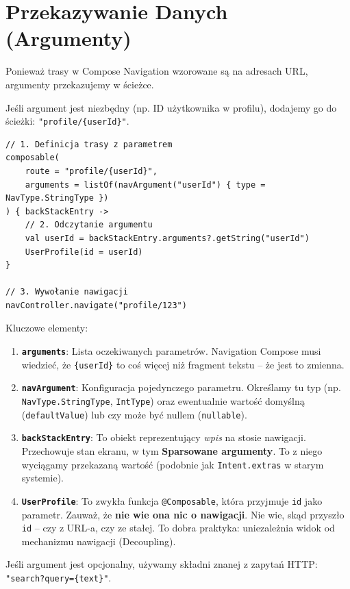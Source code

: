 \section{Przekazywanie Danych (Argumenty)}

Ponieważ trasy w Compose Navigation wzorowane są na adresach URL, argumenty przekazujemy w ścieżce.

Jeśli argument jest niezbędny (np. ID użytkownika w profilu), dodajemy go do ścieżki: \texttt{"profile/\{userId\}"}.

\begin{verbatim}
// 1. Definicja trasy z parametrem
composable(
    route = "profile/{userId}",
    arguments = listOf(navArgument("userId") { type = NavType.StringType })
) { backStackEntry ->
    // 2. Odczytanie argumentu
    val userId = backStackEntry.arguments?.getString("userId")
    UserProfile(id = userId)
}

// 3. Wywołanie nawigacji
navController.navigate("profile/123")
\end{verbatim}

Kluczowe elementy:
\begin{enumerate}
    \item \textbf{\texttt{arguments}}: Lista oczekiwanych parametrów. Navigation Compose musi wiedzieć, że \texttt{\{userId\}} to coś więcej niż fragment tekstu – że jest to zmienna.
    \item \textbf{\texttt{navArgument}}: Konfiguracja pojedynczego parametru. Określamy tu typ (np. \texttt{\-NavType.\-StringType}, \texttt{IntType}) oraz ewentualnie wartość domyślną (\texttt{defaultValue}) lub czy może być nullem (\texttt{nullable}).
    \item \textbf{\texttt{backStackEntry}}: To obiekt reprezentujący \textit{wpis} na stosie nawigacji. Przechowuje stan ekranu, w tym \textbf{Sparsowane argumenty}. To z niego wyciągamy przekazaną wartość (podobnie jak \texttt{Intent.extras} w starym systemie).
    \item \textbf{\texttt{UserProfile}}: To zwykła funkcja \texttt{@Composable}, która przyjmuje \texttt{id} jako parametr. Zauważ, że \textbf{nie wie ona nic o nawigacji}. Nie wie, skąd przyszło \texttt{id} – czy z URL-a, czy ze stałej. To dobra praktyka: uniezależnia widok od mechanizmu nawigacji (Decoupling).
\end{enumerate}

Jeśli argument jest opcjonalny, używamy składni znanej z zapytań HTTP: \texttt{"search?\-query\-=\{text\}"}.

